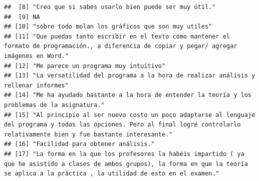 \documentclass[
]{article}
\begin{document}
\begin{verbatim}
##  [8] "Creo que si sabes usarlo bien puede ser muy útil."                                                                                                                                                                                                                          
##  [9] NA                                                                                                                                                                                                                                                                           
## [10] "sobre todo molan los gráficos que son muy utiles"                                                                                                                                                                                                                           
## [11] "Que puedas tanto escribir en el texto como mantener el formato de programación., a diferencia de copiar y pegar/ agregar imágenes en Word."                                                                                                                                 
## [12] "Me parece un programa muy intuitivo"                                                                                                                                                                                                                                        
## [13] "La versatilidad del programa a la hora de realizar análisis y rellenar informes"                                                                                                                                                                                            
## [14] "Me ha ayudado bastante a la hora de entender la teoría y los problemas de la asignatura."                                                                                                                                                                                   
## [15] "Al principio al ser nuevo costo un poco adaptarse al lenguaje del programa y todas las opciones. Pero al final logré controlarlo relativamente bien y fue bastante interesante."                                                                                            
## [16] "Facilidad para obtener análisis."                                                                                                                                                                                                                                           
## [17] "La forma en la que los profesores la habéis impartido ( ya que he asistido a clases de ambos grupos), la forma en que la teoría se aplica a la práctica , la utilidad de esto en el examen."                                                                                

\end{verbatim}
\end{document}
